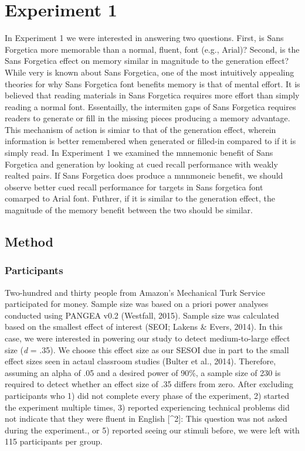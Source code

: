 \documentclass[english,pdf]{apa6}
\begin{document}
\hypertarget{experiment-1}{%
\section{Experiment 1}\label{experiment-1}}

In Experiment 1 we were interested in answering two questions. First, is Sans Forgetica more memorable than a normal, fluent, font (e.g., Arial)? Second, is the Sans Forgetica effect on memory similar in magnitude to the generation effect? While very is known about Sans Forgetica, one of the most intuitively appealing theories for why Sans Forgetica font benefits memory is that of mental effort. It is believed that reading materials in Sans Forgetica requires more effort than simply reading a normal font. Essentailly, the intermiten gaps of Sans Forgetica requires readers to generate or fill in the missing pieces producing a memory advantage. This mechanism of action is simiar to that of the generation effect, wherein information is better remembered when generated or filled-in compared to if it is simply read. In Experiment 1 we examined the mnnemonic benefit of Sans Forgetica and generation by looking at cued recall performance with weakly realted pairs. If Sans Forgetica does produce a mnnmoneic benefit, we should observe better cued recall performance for targets in Sans forgetica font comarped to Arial font. Futhrer, if it is similar to the generation effect, the magnitude of the memory benefit between the two should be similar.

\hypertarget{method}{%
\subsection{Method}\label{method}}

\hypertarget{participants}{%
\subsubsection{Participants}\label{participants}}

Two-hundred and thirty people from Amazon's Mechanical Turk Service participated for money. Sample size was based on a priori power analyses conducted using PANGEA v0.2 (Westfall, 2015). Sample size was calculated based on the smallest effect of interest (SEOI; Lakens \& Evers, 2014). In this case, we were interested in powering our study to detect medium-to-large effect size (\emph{d} = .35). We choose this effect size as our SESOI due in part to the small effect sizes seen in actaul classroom studies (Bulter et al., 2014). Therefore, assuming an alpha of .05 and a desired power of 90\%, a sample size of 230 is required to detect whether an effect size of .35 differs from zero. After excluding participants who 1) did not complete every phase of the experiment, 2) started the experiment multiple times, 3) reported experiencing technical problems did not indicate that they were fluent in English {[}\^{}2{]}: This question was not asked during the experiment., or 5) reported seeing our stimuli before, we were left with 115 participants per group.
\end{document}
